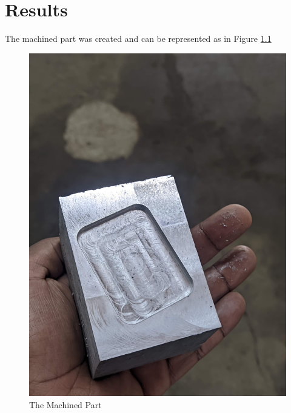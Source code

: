 \chapter{Results}
The machined part was created and can be represented as in Figure \ref{fig:result}
\begin{figure}
	\centering
	\includegraphics[width=\linewidth]{Figures/result}
	\caption[Result]{The Machined Part}
	\label{fig:result}
\end{figure}